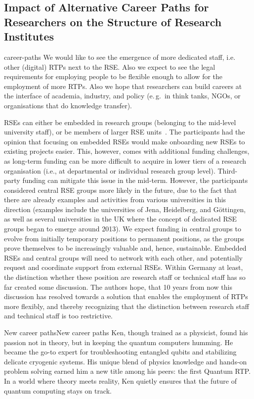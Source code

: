 \documentclass{eceasst}
\newcommand{\eg}{e.\,g.}
\begin{document}
\subsection{Impact of Alternative Career Paths for Researchers on the Structure of Research Institutes}
\begin{whatis}{}{career-paths}
We would like to see the emergence of more dedicated staff, i.e. other (digital) RTPs next to the RSE.
Also we expect to see the legal requirements for employing people to be flexible enough to allow for the employment of more RTPs.
Also we hope that researchers can build careers at the interface of academia, industry, and policy (\eg\ in think tanks, NGOs,
or organisations that do knowledge transfer).
\end{whatis}
RSEs can either be embedded in research groups (belonging to the mid-level university staff),
or be members of larger RSE units~\cite{Kempf2025-draft}.
The participants had the opinion that focusing on embedded RSEs would make onboarding new RSEs to existing projects easier.
This, however, comes with additional funding challenges,
as long-term funding can be more difficult to acquire in lower tiers of a research organisation (i.e., at departmental or individual research group level).
Third-party funding can mitigate this issue in the mid-term.
However, the participants considered central RSE groups more likely in the future,
due to the fact that there are already examples and activities from various universities in this direction
(examples include the universities of Jena, Heidelberg, and Göttingen, as well as several universities
in the UK where the concept of dedicated RSE groups began to emerge around 2013).
We expect funding in central groups to evolve from initially temporary positions to permanent positions,
as the groups prove themselves to be increasingly valuable and, hence, sustainable.
Embedded RSEs and central groups will need to network with each other,
and potentially request and coordinate support from external RSEs.
Within Germany at least, the distinction whether these position are research staff or technical staff has so far created some discussion.
The authors hope, that 10 years from now this discussion has resolved towards a solution that enables the employment of RTPs more flexibly,
and thereby recognizing that the distinction between research staff and technical staff is too restrictive.

\begin{story}{New career paths}{New career paths}
Ken, though trained as a physicist, found his passion not in theory,
but in keeping the quantum computers humming. He became the go-to expert
for troubleshooting entangled qubits and stabilizing delicate cryogenic systems.
His unique blend of physics knowledge and hands-on problem solving earned him
a new title among his peers: the first Quantum RTP.
In a world where theory meets reality, Ken quietly ensures that the future
of quantum computing stays on track.
\end{story}
\end{document}
